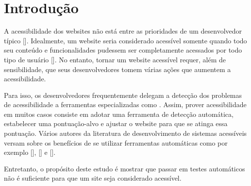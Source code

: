 \documentclass[sigconf]{acmart}
\begin{document}




\maketitle






\section{Introdução}

A acessibilidade dos websites não está entre as prioridades de um desenvolvedor típico []. Idealmente, um website seria considerado acessível somente quando todo seu conteúdo e funcionalidades pudessem ser completamente acessados por todo tipo de usuário []. No entanto, tornar um website acessível requer, além de sensibilidade, que seus desenvolvedores tomem várias ações que aumentem a acessibilidade.

Para isso, os desenvolvedores frequentemente delegam a detecção dos problemas de acessibilidade a ferramentas especializadas como . Assim, prover acessibilidade em muitos casos consiste em adotar uma ferramenta de detecção automática, estabelecer uma pontuação-alvo e ajustar o website para que se atinga essa pontuação. Vários autores da literatura de desenvolvimento de sistemas acessíveis versam sobre os benefícios de se utilizar ferramentas automáticas como por exemplo  [],  [] e  [].

Entretanto, o propósito deste estudo é mostrar que passar em testes automáticos não é suficiente para que um site seja considerado acessível.
\end{document}
